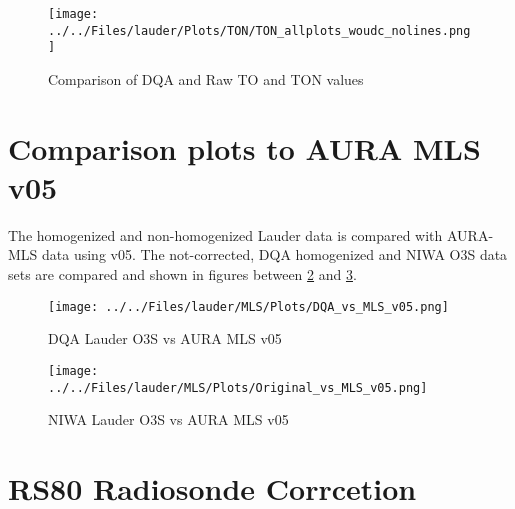                                                 \begin{figure}
        \centering
\texttt{[image: ../../Files/lauder/Plots/TON/TON\_allplots\_woudc\_nolines.png]}
    \caption{Comparison of DQA and Raw TO and TON values}
            \label{fig:ton2}
    \end{figure}

%
\section{Comparison plots to AURA MLS v05}

    The homogenized and non-homogenized Lauder data is compared with AURA-MLS data using v05. The not-corrected,
    DQA homogenized and NIWA O3S data sets are compared and shown in figures between
\ref{fig:dqav05} and \ref{fig:niwav05}.


                            \begin{figure}
        \centering
\texttt{[image: ../../Files/lauder/MLS/Plots/DQA\_vs\_MLS\_v05.png]}
    \caption{DQA Lauder O3S vs AURA MLS v05 }
            \label{fig:dqav05}
    \end{figure}

                                \begin{figure}
        \centering
\texttt{[image: ../../Files/lauder/MLS/Plots/Original\_vs\_MLS\_v05.png]}
    \caption{ NIWA Lauder O3S vs AURA MLS v05  }
            \label{fig:niwav05}
    \end{figure}

%
    \section{RS80 Radiosonde Corrcetion}


